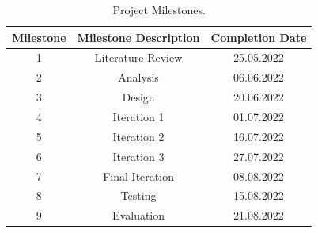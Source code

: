 \begin{table}[!h]
	\centering
	\begin{tabular}{ |c|c|c| } 
		\hline
		Milestone & Milestone Description & Completion Date \\
		\hline
		1 & Literature Review & 25.05.2022 \\ 
		2 & Analysis & 06.06.2022 \\ 
		3 & Design & 20.06.2022 \\ 
		4 & Iteration 1 & 01.07.2022 \\
		5 & Iteration 2 & 16.07.2022 \\
		6 & Iteration 3 & 27.07.2022 \\
		7 & Final Iteration & 08.08.2022 \\
		8 & Testing & 15.08.2022 \\
		9 & Evaluation & 21.08.2022 \\
		\hline
	\end{tabular}
	\caption{Project Milestones.}
	\label{table:1}
\end{table}

